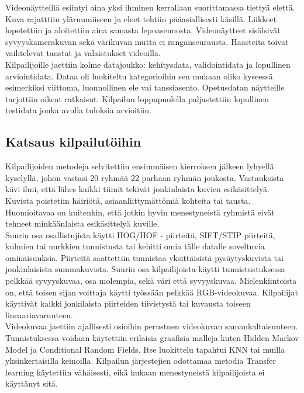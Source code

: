 Videonäytteillä esiintyi aina yksi ihminen kerrallaan suorittamassa tiettyä elettä. Kuva rajatttiin yläruumiiseen ja eleet tehtiin
pääasiallisesti käsillä. Liikkeet lopetettiin ja aloitettiin aina samasta lepoasennosta. Videonäytteet sisälsivät syvyyskamerakuvan sekä värikuvan 
mutta ei ranganseurausta. Haasteita toivat vaihtelevat taustat ja valaistukset videoilla. \\

Kilpailijoille jaettiin kolme datajoukko: kehitysdata, validointidata ja lopullinen arviointidata. Dataa oli luokiteltu kategorioihin sen mukaan
oliko kyseessä esimerkiksi viittoma, luonnollinen ele vai tanssiasento. Opetusdatan näytteille tarjottiin oikeat ratkaisut.
Kilpailun loppupuolella paljastettiin lopullinen testidata jonka avulla tuloksia arvioitiin.
\citep {6239178} \\


\subsection{Katsaus kilpailutöihin}
Kilpailijoiden metodeja selvitettiin ensimmäisen kierroksen jälkeen lyhyellä kyselyllä, johon vastasi 20 ryhmää 22 parhaan ryhmän joukosta.
Vastauksista kävi ilmi, että lähes kaikki tiimit tekivät jonkinlaista kuvien esikäsittelyä. Kuvista poistetiin häiriötä, asiaanliittymättömiä 
kohteita tai tausta. Huomioitavaa on kuitenkin, että jotkin hyvin menestyneistä ryhmistä eivät tehneet minkäänlaista esikäsittelyä kuville.\\

Suurin osa osallistujista käytti HOG/HOF - piirteitä, SIFT/STIP piirteitä, kulmien tai nurkkien tunnistusta tai kehitti omia tälle datalle 
soveltuvia ominaisuuksia. Piirteitä saattettiin tunnistaa yksittäisistä pysäytyskuvista tai jonkinlaisista summakuvista.
Suurin osa kilpailijoista käytti tunnistustuksessa pelkkää syvyyskuvaa, osa molempia, sekä väri että syvyyskuvaa. 
Mielenkiintoista on, että toisen sijan voittaja käytti työssään pelkkää RGB-videokuvaa. 
Kilpailijat käyttivät kaikki jonkilaista piirteiden tiivistystä tai kuvausta toiseen lineaariavaruuteen.\\

Videokuvaa jaettiin ajallisesti osioihin perustuen videokuvan samankaltaisuuteen. Tunnistuksessa voidaan käytettiin erilaisia graafisia malleja
kuten Hidden Markov Model ja Conditional Random Fields. Itse luokittelu tapahtui KNN tai muilla yksinkertaisilla keinoilla. 
Kilpailun järjestejien odottamaa metodia Transfer learning käytettiin vähäisesti, eikä kukaan menestyneistä kilpailijoista ei käyttänyt sitä.\\
\citep {6239178} 

